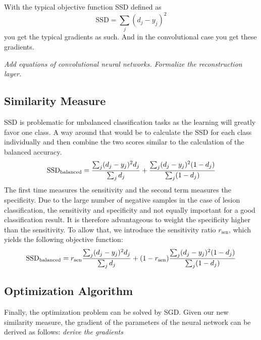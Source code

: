 With the typical objective function SSD defined as
\begin{equation} 
\text{SSD} = \sum_j (d_j - y_j)^2 
\end{equation}
you get the typical gradients as such. And in the convolutional case you get
these gradients.

\emph{Add equations of convolutional neural networks. Formalize the
reconstruction layer.}

\subsection{Similarity Measure}

SSD is problematic for unbalanced classification tasks as the learning will
greatly favor one class. A way around that would be to calculate the SSD for
each class individually and then combine the two scores similar to the
calculation of the balanced accuracy.
\begin{equation} 
\text{SSD}_\text{balanced} = \frac{\textstyle\sum_j (d_j - y_j)^2 d_j}{%
\textstyle\sum_j d_j} + \frac{\textstyle\sum_j (d_j - y_j)^2 (1 - d_j)}{%
\textstyle\sum_j (1 - d_j)}
\end{equation}
The first time measures the sensitivity and the second term measures the
specificity. Due to the large number of negative samples in the case of lesion
classification, the sensitivity and specificity and not equally important for a
good classification result. It is therefore advantageous to weight the
specificity higher than the sensitivity. To allow that, we introduce the
sensitivity ratio $r_\text{sen}$, which yields the following objective function:
\begin{equation} 
\text{SSD}_\text{balanced} = r_\text{sen}\frac{\textstyle\sum_j (d_j - y_j)^2
d_j}{\textstyle\sum_j d_j} 
+ (1-r_\text{sen})\frac{\textstyle\sum_j (d_j - y_j)^2 (1 - d_j)}{%
\textstyle\sum_j (1 - d_j)}
\end{equation}

\subsection{Optimization Algorithm}

Finally, the optimization problem can be solved by SGD. Given our new similarity
measure, the gradient of the parameters of the neural network can be derived as
follows: \emph{derive the gradients}

